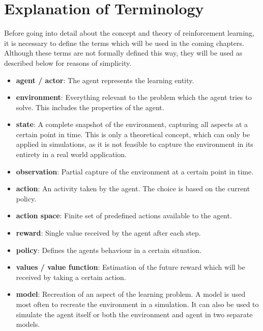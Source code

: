\section{Explanation of Terminology}
Before going into detail about the concept and theory of reinforcement learning, it is necessary to define the terms which will be used in the coming chapters. Although these terms are not formally defined this way, they will be used as described below for reasons of simplicity.
\begin{itemize}
    \item \textbf{agent / actor}: The agent represents the learning entity.
    \item \textbf{environment}: Everything relevant to the problem which the agent tries to solve. This includes the properties of the agent.
    \item \textbf{state}: A complete snapshot of the environment, capturing all aspects at a certain point in time. This is only a theoretical concept, which can only be applied in simulations, as it is not feasible to capture the environment in its entirety in a real world application.
    \item \textbf{observation}: Partial capture of the environment at a certain point in time.
    \item \textbf{action}: An activity taken by the agent. The choice is based on the current policy.
    \item \textbf{action space}: Finite set of predefined actions available to the agent.
    \item \textbf{reward}: Single value received by the agent after each step.
    \item \textbf{policy}: Defines the agents behaviour in a certain situation.
    \item \textbf{values / value function}: Estimation of the future reward which will be received by taking a certain action.
    \item \textbf{model}: Recreation of an aspect of the learning problem. A model is used most often to recreate the environment in a simulation. It can also be used to simulate the agent itself or both the environment and agent in two separate models.
\end{itemize}

